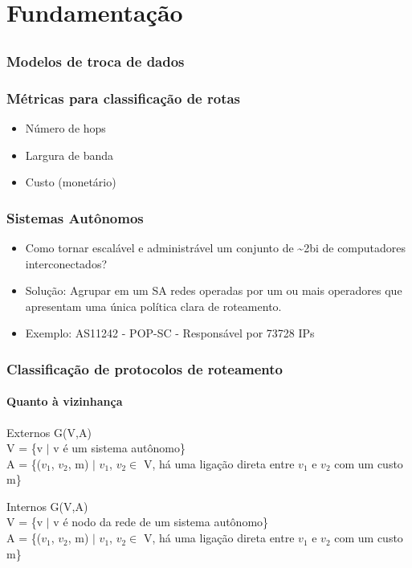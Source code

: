 \documentclass{beamer}
\begin{document}
\section{Fundamentação}
\subsection{}

\begin{frame}
\frametitle{Modelos de troca de dados}
 	
\end{frame}

\begin{frame}
\frametitle{Métricas para classificação de rotas}
\begin{itemize}
  \setlength{\itemsep}{0.7cm}%
  \item Número de hops
  \item Largura de banda
  \item Custo (monetário)
\end{itemize}
\end{frame}

\begin{frame}
\frametitle{Sistemas Autônomos}
\begin{itemize}
  \setlength{\itemsep}{0.7cm}%
  \item Como tornar escalável e administrável um conjunto de \textasciitilde2bi de
  computadores interconectados?
  \item Solução: Agrupar em um SA redes operadas por um ou mais operadores que apresentam uma única política clara de roteamento.
  \item Exemplo: AS11242 - POP-SC - Responsável por 73728 IPs 
\end{itemize}
\end{frame}

\begin{frame}
\frametitle{Classificação de protocolos de roteamento}
\framesubtitle{Quanto à vizinhança}
\begin{block}{Externos}
G(V,A)\\
V = \{v $\mid$ v  é um sistema autônomo\}\\
A = \{($v_1$, $v_2$, m) $\mid$ $v_1$, $v_2 \in$ V, há uma ligação direta
entre $v_1$ e $v_2$  com um custo m\}
\end{block}

\begin{block}{Internos}
G(V,A)\\
V = \{v $\mid$ v é nodo da rede de um sistema autônomo\}\\
A = \{($v_1$, $v_2$, m) $\mid$ $v_1$, $v_2 \in$ V, há uma ligação direta
entre $v_1$ e $v_2$  com um custo m\}
\end{block}
\end{frame}
\end{document}
